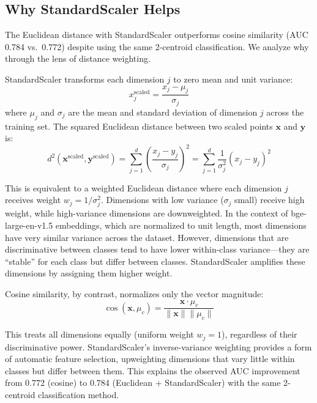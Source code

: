 \documentclass[12pt,a4paper]{article}
\begin{document}
\subsection{Why StandardScaler Helps}\label{sec:scaler}

The Euclidean distance with StandardScaler outperforms cosine similarity (AUC 0.784 vs.\ 0.772) despite using the same 2-centroid classification. We analyze why through the lens of distance weighting.

StandardScaler transforms each dimension $j$ to zero mean and unit variance:
\begin{equation}
x_j^{\text{scaled}} = \frac{x_j - \mu_j}{\sigma_j}
\label{eq:scaler}
\end{equation}
where $\mu_j$ and $\sigma_j$ are the mean and standard deviation of dimension $j$ across the training set. The squared Euclidean distance between two scaled points $\mathbf{x}$ and $\mathbf{y}$ is:
\begin{equation}
d^2(\mathbf{x}^{\text{scaled}}, \mathbf{y}^{\text{scaled}}) = \sum_{j=1}^{d} \left(\frac{x_j - y_j}{\sigma_j}\right)^2 = \sum_{j=1}^{d} \frac{1}{\sigma_j^2} (x_j - y_j)^2
\label{eq:weighted_euc}
\end{equation}

This is equivalent to a weighted Euclidean distance where each dimension $j$ receives weight $w_j = 1/\sigma_j^2$. Dimensions with low variance ($\sigma_j$ small) receive high weight, while high-variance dimensions are downweighted. In the context of bge-large-en-v1.5 embeddings, which are normalized to unit length, most dimensions have very similar variance across the dataset. However, dimensions that are discriminative between classes tend to have lower within-class variance---they are ``stable'' for each class but differ between classes. StandardScaler amplifies these dimensions by assigning them higher weight.

Cosine similarity, by contrast, normalizes only the vector magnitude:
\begin{equation}
\cos(\mathbf{x}, \mu_c) = \frac{\mathbf{x} \cdot \mu_c}{\|\mathbf{x}\| \|\mu_c\|}
\label{eq:cosine}
\end{equation}

This treats all dimensions equally (uniform weight $w_j = 1$), regardless of their discriminative power. StandardScaler's inverse-variance weighting provides a form of automatic feature selection, upweighting dimensions that vary little within classes but differ between them. This explains the observed AUC improvement from 0.772 (cosine) to 0.784 (Euclidean + StandardScaler) with the same 2-centroid classification method.
\end{document}
